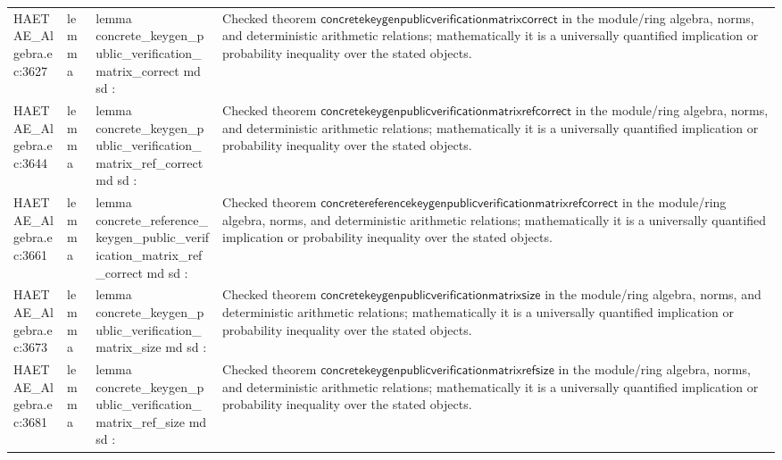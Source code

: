 \documentclass[10pt]{article}
\begin{document}
\begin{longtable}{L{0.11\textwidth}L{0.055\textwidth}L{0.385\textwidth}L{0.41\textwidth}}
HAETAE\_\allowbreak{}Algebra.\allowbreak{}ec:\allowbreak{}3627 & lemma & {\ttfamily\scriptsize lemma concrete\_\allowbreak{}keygen\_\allowbreak{}public\_\allowbreak{}verification\_\allowbreak{}matrix\_\allowbreak{}correct md sd :} & Checked theorem $\mathsf{concretekeygenpublicverificationmatrixcorrect}$ in the module/ring algebra, norms, and deterministic arithmetic relations; mathematically it is a universally quantified implication or probability inequality over the stated objects. \\
HAETAE\_\allowbreak{}Algebra.\allowbreak{}ec:\allowbreak{}3644 & lemma & {\ttfamily\scriptsize lemma concrete\_\allowbreak{}keygen\_\allowbreak{}public\_\allowbreak{}verification\_\allowbreak{}matrix\_\allowbreak{}ref\_\allowbreak{}correct md sd :} & Checked theorem $\mathsf{concretekeygenpublicverificationmatrixrefcorrect}$ in the module/ring algebra, norms, and deterministic arithmetic relations; mathematically it is a universally quantified implication or probability inequality over the stated objects. \\
HAETAE\_\allowbreak{}Algebra.\allowbreak{}ec:\allowbreak{}3661 & lemma & {\ttfamily\scriptsize lemma concrete\_\allowbreak{}reference\_\allowbreak{}keygen\_\allowbreak{}public\_\allowbreak{}verification\_\allowbreak{}matrix\_\allowbreak{}ref\_\allowbreak{}correct md sd :} & Checked theorem $\mathsf{concretereferencekeygenpublicverificationmatrixrefcorrect}$ in the module/ring algebra, norms, and deterministic arithmetic relations; mathematically it is a universally quantified implication or probability inequality over the stated objects. \\
HAETAE\_\allowbreak{}Algebra.\allowbreak{}ec:\allowbreak{}3673 & lemma & {\ttfamily\scriptsize lemma concrete\_\allowbreak{}keygen\_\allowbreak{}public\_\allowbreak{}verification\_\allowbreak{}matrix\_\allowbreak{}size md sd :} & Checked theorem $\mathsf{concretekeygenpublicverificationmatrixsize}$ in the module/ring algebra, norms, and deterministic arithmetic relations; mathematically it is a universally quantified implication or probability inequality over the stated objects. \\
HAETAE\_\allowbreak{}Algebra.\allowbreak{}ec:\allowbreak{}3681 & lemma & {\ttfamily\scriptsize lemma concrete\_\allowbreak{}keygen\_\allowbreak{}public\_\allowbreak{}verification\_\allowbreak{}matrix\_\allowbreak{}ref\_\allowbreak{}size md sd :} & Checked theorem $\mathsf{concretekeygenpublicverificationmatrixrefsize}$ in the module/ring algebra, norms, and deterministic arithmetic relations; mathematically it is a universally quantified implication or probability inequality over the stated objects. \\

\end{longtable}
\end{document}
